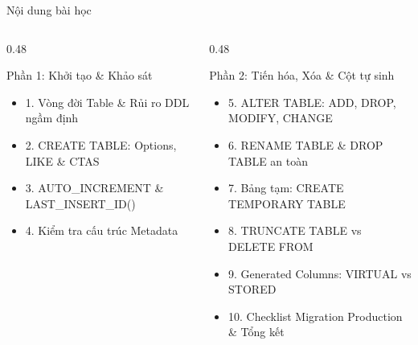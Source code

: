 \documentclass[aspectratio=169,11pt]{beamer}
\begin{document}
\begin{frame}{Nội dung bài học}
\begin{columns}[t]
  \begin{column}{0.48\textwidth}
    \begin{block}{Phần 1: Khởi tạo \& Khảo sát}
      \begin{itemize}\setlength{\itemsep}{1.5pt}
        \item 1. Vòng đời Table \& Rủi ro DDL ngầm định
        \item 2. CREATE TABLE: Options, LIKE \& CTAS
        \item 3. AUTO\_INCREMENT \& LAST\_INSERT\_ID()
        \item 4. Kiểm tra cấu trúc Metadata
      \end{itemize}
    \end{block}
  \end{column}
  \begin{column}{0.48\textwidth}
    \begin{block}{Phần 2: Tiến hóa, Xóa \& Cột tự sinh}
      \begin{itemize}\setlength{\itemsep}{1.5pt}
        \item 5. ALTER TABLE: ADD, DROP, MODIFY, CHANGE
        \item 6. RENAME TABLE \& DROP TABLE an toàn
        \item 7. Bảng tạm: CREATE TEMPORARY TABLE
        \item 8. TRUNCATE TABLE vs DELETE FROM
        \item 9. Generated Columns: VIRTUAL vs STORED
        \item 10. Checklist Migration Production \& Tổng kết
      \end{itemize}
    \end{block}
  \end{column}
\end{columns}
\end{frame}

\end{document}
